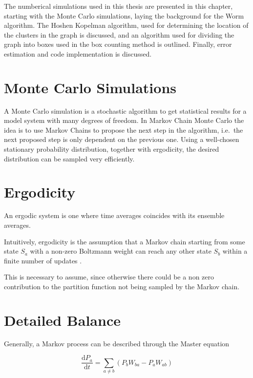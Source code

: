 
The numberical simulations used in this thesis are presented in this chapter, starting with the Monte Carlo simulations, laying the background for the Worm algorithm. The Hoshen Kopelman algorithm, used for determining the location of the clusters in the graph is discussed, and an algorithm used for dividing the graph into boxes used in the box counting method is outlined. Finally, error estimation and code implementation is discussed.

\section{Monte Carlo Simulations}
\label{sec:MonteCarloSims}

A Monte Carlo simulation is a stochastic algorithm to get statistical results for a model system with many degrees of freedom. In Markov Chain Monte Carlo the idea is to use Markov Chains to propose the next step in the algorithm, i.e.\ the next proposed step is only dependent on the previous one. Using a well-chosen stationary probability distribution, together with ergodicity, the desired distribution can be sampled very efficiently.

\section{Ergodicity}
\label{sec:Ergodicity}

An ergodic system is one where time averages coincides with its ensemble averages. 

Intuitively, ergodicity is the assumption that a Markov chain starting from some state $S_a$ with a non-zero Boltzmann weight can reach any other state $S_b$ within a finite number of updates \cite{Zwanzig:nonequil_stat_mech}.

This is necessary to assume, since otherwise there could be a non zero contribution to the partition function not being sampled by the Markov chain.

\section{Detailed Balance}
\label{sec:DetailedBalance}

Generally, a Markov process can be described through the Master equation

\begin{equation}
    \frac{\mathrm d P_a}{\mathrm d t} = \sum_{a \neq b} \left ( P_b W_{ba} - P_a W_{ab} \right )
\end{equation}

